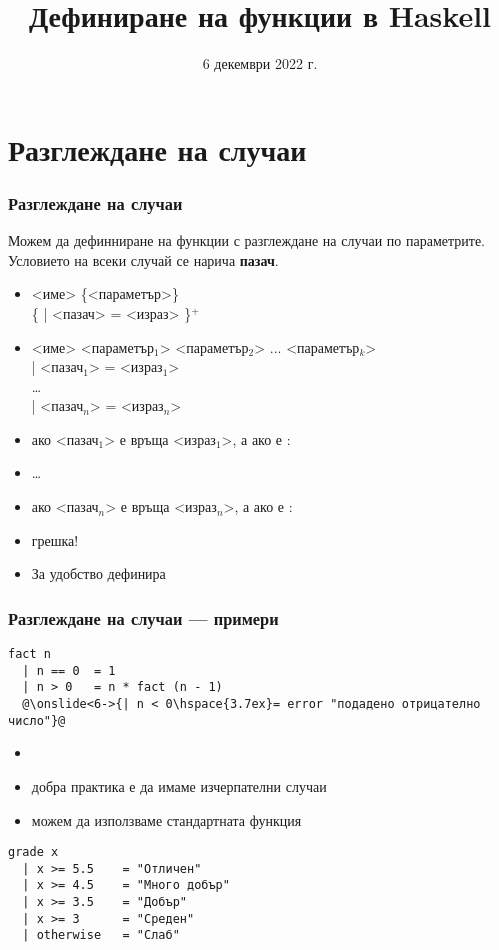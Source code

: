 \documentclass[alsotrans]{beamerswitch}
\title{Дефиниране на функции в Haskell}
\date{6 декември 2022 г.}
\begin{document}
\begin{frame}
  \titlepage
\end{frame}

\section{Разглеждане на случаи}

\begin{frame}[fragile]
  \frametitle{Разглеждане на случаи}

  Можем да дефинниране на функции с разглеждане на случаи по параметрите.\\
  Условието на всеки случай се нарича \textbf{пазач}.
  \begin{itemize}
    \item{} <име> \{<параметър>\}\\
      \hspace{3ex} \{ \tta| <пазач> \tta= <израз> \}$^+$
      \pause
    \item{} <име> <параметър$_1$> <параметър$_2$> ... <параметър$_k$>\\
      \hspace{3ex} \tta| <пазач$_1$> \tta= <израз$_1$>\\
      \hspace{3ex} \ldots\\
      \hspace{3ex} \tta| <пазач$_n$> \tta= <израз$_n$>\\
      \pause
    \item ако <пазач$_1$> е  връща <израз$_1$>, а ако е :
    \item \ldots
    \item ако <пазач$_n$> е  връща <израз$_n$>, а ако е :
    \item \alert{грешка!}
      \pause
    \item За удобство  дефинира 
  \end{itemize}
\end{frame}

\begin{frame}[fragile]
  \frametitle{Разглеждане на случаи --- примери}

\begin{lstlisting}
fact n
  | n == 0  = 1
  | n > 0   = n * fact (n - 1)
  @\onslide<6->{| n < 0\hspace{3.7ex}= error "подадено отрицателно число"}@
\end{lstlisting}
\onslide<+->
\begin{itemize}[<+->]
\item {}
\item добра практика е да имаме изчерпателни случаи
\item можем да използваме стандартната функция 
\end{itemize}
\onslide<+->
\onslide<+->
\begin{lstlisting}
grade x
  | x >= 5.5    = "Отличен"
  | x >= 4.5    = "Много добър"
  | x >= 3.5    = "Добър"
  | x >= 3      = "Среден"
  | otherwise   = "Слаб"
\end{lstlisting}
\end{frame}
\end{document}
